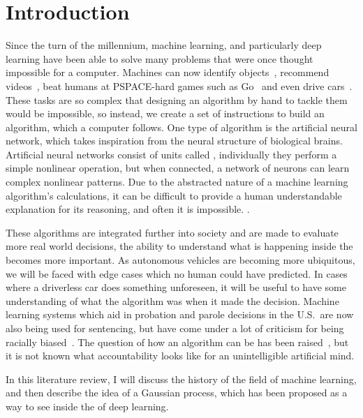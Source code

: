 
\section{Introduction}

Since the turn of the millennium, machine learning, and particularly deep learning have been able to solve many problems that were once thought impossible for a computer.
Machines can now identify objects~\autocite{li2018}, recommend videos~\autocite{bennett2007}, beat humans at PSPACE-hard games such as Go~\autocite{chao2018} and even drive cars~\autocite{gerla2014}.
These tasks are so complex that designing an algorithm by hand to tackle them would be impossible, so instead, we create a set of instructions to build an algorithm, which a computer follows.
One type of algorithm is the artificial neural network, which takes inspiration from the neural structure of biological brains.
Artificial neural networks consist of units called , individually they perform a simple nonlinear operation, but when connected, a network of neurons can learn complex nonlinear patterns.
Due to the abstracted nature of a machine learning algorithm's calculations, it can be difficult to provide a human understandable explanation for its reasoning, and often it is impossible.
.

These algorithms are integrated further into society and are made to evaluate more real world decisions, the ability to understand what is happening inside the  becomes more important.
As autonomous vehicles are becoming more ubiquitous, we will be faced with edge cases which no human could have predicted.
In cases where a driverless car does something unforeseen, it will be useful to have some understanding of what the algorithm was  when it made the decision.
Machine learning systems which aid in probation and parole decisions in the U.S.\ are now also being used for sentencing, but have come under a lot of criticism for being racially biased~\autocite{christin2015}.
The question of how an algorithm can be  has been raised~\autocite[9]{christin2015}, but it is not known what accountability looks like for an unintelligible artificial mind.

In this literature review, I will discuss the history of the field of machine learning, and then describe the idea of a Gaussian process, which has been proposed as a way to see inside the  of deep learning.

